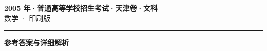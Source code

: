 \documentclass[zihao=5, a4paper]{ctexart}
\begin{document}
\begin{center}
  {\Large\bfseries 2005 年·普通高等学校招生考试·天津卷·文科}\\[4pt]
  {\large 数学 · 印刷版}
\end{center}
\medskip
{}

\par\bigskip\hrule\bigskip
{}
\begin{center}{\large\bfseries 参考答案与详细解析}\end{center}
\smallskip

\end{document}
